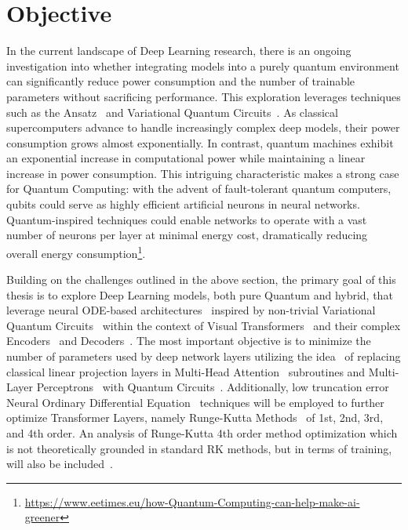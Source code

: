 \documentclass[12pt,a4paper]{report}
\begin{document}
\section{Objective}\vspace{-12pt}
In the current landscape of Deep Learning research, there is an ongoing investigation into whether integrating models into a purely quantum environment can significantly reduce power consumption and the number of trainable parameters without sacrificing performance. This exploration leverages techniques such as the Ansatz~\cite{hadfield2019Quantum} and Variational Quantum Circuits~\cite{cerezo2021variational}. As classical supercomputers advance to handle increasingly complex deep models, their power consumption grows almost exponentially. In contrast, quantum machines exhibit an exponential increase in computational power while maintaining a linear increase in power consumption. This intriguing characteristic makes a strong case for Quantum Computing: with the advent of fault-tolerant quantum computers, qubits could serve as highly efficient artificial neurons in neural networks. Quantum-inspired techniques could enable networks to operate with a vast number of neurons per layer at minimal energy cost, dramatically reducing overall energy consumption\footnote{\url{https://www.eetimes.eu/how-Quantum-Computing-can-help-make-ai-greener}}.

Building on the challenges outlined in the above section, the primary goal of this thesis is to explore Deep Learning models, both pure Quantum and hybrid, that leverage neural ODE-based architectures~\cite{zhong2022neural} inspired by non-trivial Variational Quantum Circuits~\cite{cerezo2021variational} within the context of Visual Transformers~\cite{vaswani2017attention, dosovitskiy2020} and their complex Encoders~\cite{hinton2011transforming} and Decoders~\cite{breuckmann2018scalable}. The most important objective is to minimize the number of parameters used by deep network layers utilizing the idea~\cite{Comajoan_Cara_2024} of replacing classical linear projection layers in Multi-Head Attention~\cite{voita2019analyzing} subroutines and Multi-Layer Perceptrons~\cite{popescu2009multilayer} with Quantum Circuits~\cite{benedetti2019parameterized}. Additionally, low truncation error Neural Ordinary Differential Equation~\cite{zhong2022neural}\cite{li2022ode} techniques will be employed to further optimize Transformer Layers, namely Runge-Kutta Methods~\cite{butcher1996history} of 1st, 2nd, 3rd, and 4th order. An analysis of Runge-Kutta 4th order method optimization which is not theoretically grounded in standard RK methods, but in terms of training, will also be included~\cite{li2022ode}.
\end{document}
